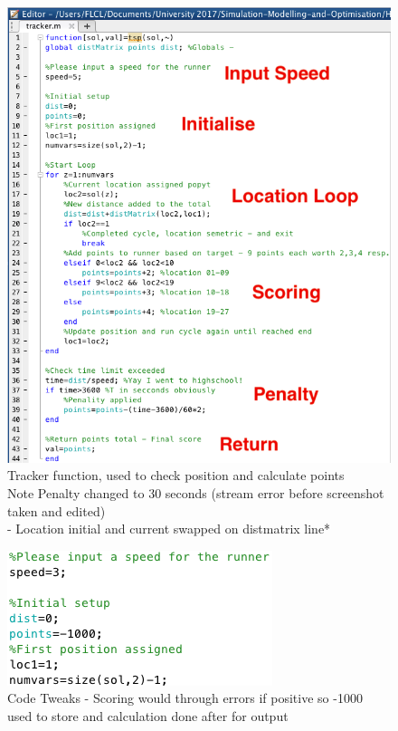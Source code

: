 \documentclass[a4paper, 10pt]{IEEEconf}
\begin{document}
\begin{figure}[H]
  \includegraphics[width=\linewidth, center]{images/tracker}
  \caption{Tracker function, used to check position and calculate points \\ Note Penalty changed to 30 seconds (stream error before screenshot taken and edited) \\ - Location initial and current swapped on distmatrix line*}
  \label{fig:Tracker function, used to check position and calculate points}
\end{figure}

\begin{figure}[H]
  \includegraphics[width=\linewidth, center]{images/code1}
  \caption{Code Tweaks - Scoring would through errors if positive so -1000 used to store and calculation done after for output}
  \label{fig:Code Tweaks - Scoring would through errors if positive so -1000 used to store and calculation done after for output}
\end{figure}
\end{document}
